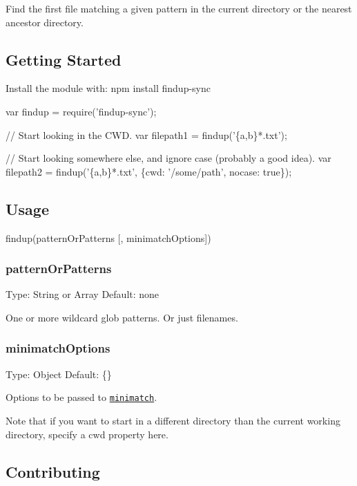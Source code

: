 Find the first file matching a given pattern in the current directory or the nearest ancestor directory.

\subsection*{Getting Started}

Install the module with\+: {\ttfamily npm install findup-\/sync}


\begin{DoxyCode}
var findup = require('findup-sync');

// Start looking in the CWD.
var filepath1 = findup('\{a,b\}*.txt');

// Start looking somewhere else, and ignore case (probably a good idea).
var filepath2 = findup('\{a,b\}*.txt', \{cwd: '/some/path', nocase: true\});
\end{DoxyCode}


\subsection*{Usage}


\begin{DoxyCode}
findup(patternOrPatterns [, minimatchOptions])
\end{DoxyCode}


\subsubsection*{pattern\+Or\+Patterns}

Type\+: {\ttfamily String} or {\ttfamily Array} Default\+: none

One or more wildcard glob patterns. Or just filenames.

\subsubsection*{minimatch\+Options}

Type\+: {\ttfamily Object} Default\+: {\ttfamily \{\}}

Options to be passed to \href{https://github.com/isaacs/minimatch}{\tt minimatch}.

Note that if you want to start in a different directory than the current working directory, specify a {\ttfamily cwd} property here.

\subsection*{Contributing}

